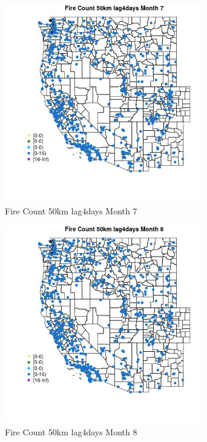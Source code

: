 \begin{figure} 
\centering  
\includegraphics[width=0.77\textwidth]{Code_Outputs/Report_ML_input_PM25_Step4_part_e_de_duplicated_aves_compiled_2019-05-21wNAs_MapObsMo7Fire_Count_50km_lag4days.jpg} 
\caption{\label{fig:Report_ML_input_PM25_Step4_part_e_de_duplicated_aves_compiled_2019-05-21wNAsMapObsMo7Fire_Count_50km_lag4days}Fire Count 50km lag4days Month 7} 
\end{figure} 
 

\begin{figure} 
\centering  
\includegraphics[width=0.77\textwidth]{Code_Outputs/Report_ML_input_PM25_Step4_part_e_de_duplicated_aves_compiled_2019-05-21wNAs_MapObsMo8Fire_Count_50km_lag4days.jpg} 
\caption{\label{fig:Report_ML_input_PM25_Step4_part_e_de_duplicated_aves_compiled_2019-05-21wNAsMapObsMo8Fire_Count_50km_lag4days}Fire Count 50km lag4days Month 8} 
\end{figure} 
 

